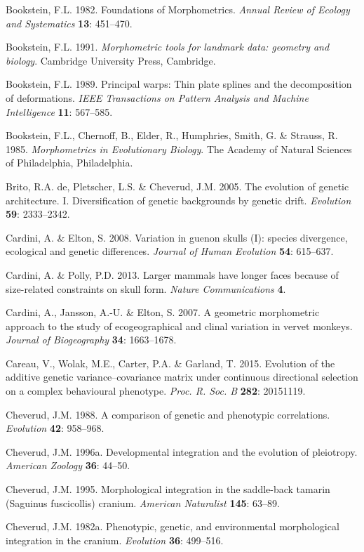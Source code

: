 \documentclass[12pt,twoside]{report}
\begin{document}
Bookstein, F.L. 1982. Foundations of Morphometrics. \emph{Annual Review
of Ecology and Systematics} \textbf{13}: 451--470.

Bookstein, F.L. 1991. \emph{Morphometric tools for landmark data:
geometry and biology}. Cambridge University Press, Cambridge.

Bookstein, F.L. 1989. Principal warps: Thin plate splines and the
decomposition of deformations. \emph{IEEE Transactions on Pattern
Analysis and Machine Intelligence} \textbf{11}: 567--585.

Bookstein, F.L., Chernoff, B., Elder, R., Humphries, Smith, G. \&
Strauss, R. 1985. \emph{Morphometrics in Evolutionary Biology}. The
Academy of Natural Sciences of Philadelphia, Philadelphia.

Brito, R.A. de, Pletscher, L.S. \& Cheverud, J.M. 2005. The evolution of
genetic architecture. I. Diversification of genetic backgrounds by
genetic drift. \emph{Evolution} \textbf{59}: 2333--2342.

Cardini, A. \& Elton, S. 2008. Variation in guenon skulls (I): species
divergence, ecological and genetic differences. \emph{Journal of Human
Evolution} \textbf{54}: 615--637.

Cardini, A. \& Polly, P.D. 2013. Larger mammals have longer faces
because of size-related constraints on skull form. \emph{Nature
Communications} \textbf{4}.

Cardini, A., Jansson, A.-U. \& Elton, S. 2007. A geometric morphometric
approach to the study of ecogeographical and clinal variation in vervet
monkeys. \emph{Journal of Biogeography} \textbf{34}: 1663--1678.

Careau, V., Wolak, M.E., Carter, P.A. \& Garland, T. 2015. Evolution of
the additive genetic variance--covariance matrix under continuous
directional selection on a complex behavioural phenotype. \emph{Proc. R.
Soc. B} \textbf{282}: 20151119.

Cheverud, J.M. 1988. A comparison of genetic and phenotypic
correlations. \emph{Evolution} \textbf{42}: 958--968.

Cheverud, J.M. 1996a. Developmental integration and the evolution of
pleiotropy. \emph{American Zoology} \textbf{36}: 44--50.

Cheverud, J.M. 1995. Morphological integration in the saddle-back
tamarin (Saguinus fuscicollis) cranium. \emph{American Naturalist}
\textbf{145}: 63--89.

Cheverud, J.M. 1982a. Phenotypic, genetic, and environmental
morphological integration in the cranium. \emph{Evolution} \textbf{36}:
499--516.
\end{document}
